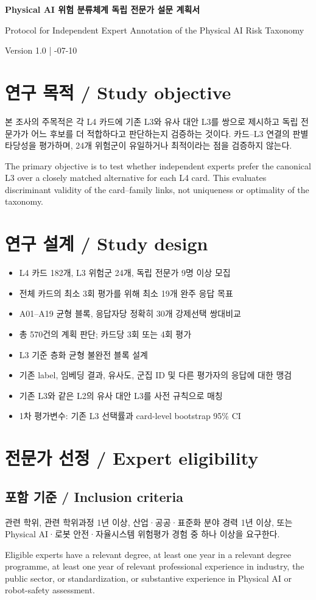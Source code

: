 \documentclass[11pt,a4paper]{article}
\newcommand{\bisection}[2]{\section{#1 / \texorpdfstring{\color{teal}}{}#2}}
\newcommand{\bisubsection}[2]{\subsection{#1 / #2}}
\begin{document}
\begin{center}
{\LARGE\bfseries\color{navy} Physical AI 위험 분류체계 독립 전문가 설문 계획서\par}
\vspace{5pt}
{\Large Protocol for Independent Expert Annotation of the Physical AI Risk Taxonomy\par}
\vspace{10pt}
Version 1.0 \quad | -07-10
\end{center}

\bisection{연구 목적}{Study objective}
본 조사의 주목적은 각 L4 카드에 기존 L3와 유사 대안 L3를 쌍으로 제시하고 독립 전문가가 어느 후보를 더 적합하다고 판단하는지 검증하는 것이다. 카드--L3 연결의 판별 타당성을 평가하며, 24개 위험군이 유일하거나 최적이라는 점을 검증하지 않는다.

The primary objective is to test whether independent experts prefer the canonical L3 over a closely matched alternative for each L4 card. This evaluates discriminant validity of the card--family links, not uniqueness or optimality of the taxonomy.

\bisection{연구 설계}{Study design}
\begin{itemize}
\item L4 카드 182개, L3 위험군 24개, 독립 전문가 9명 이상 모집
\item 전체 카드의 최소 3회 평가를 위해 최소 19개 완주 응답 목표
\item A01--A19 균형 블록, 응답자당 정확히 30개 강제선택 쌍대비교
\item 총 570건의 계획 판단; 카드당 3회 또는 4회 평가
\item L3 기준 층화 균형 불완전 블록 설계
\item 기존 label, 임베딩 결과, 유사도, 군집 ID 및 다른 평가자의 응답에 대한 맹검
\item 기존 L3와 같은 L2의 유사 대안 L3를 사전 규칙으로 매칭
\item 1차 평가변수: 기존 L3 선택률과 card-level bootstrap 95\% CI
\end{itemize}

\bisection{전문가 선정}{Expert eligibility}
\bisubsection{포함 기준}{Inclusion criteria}
관련 학위, 관련 학위과정 1년 이상, 산업·공공·표준화 분야 경력 1년 이상, 또는 Physical AI·로봇 안전·자율시스템 위험평가 경험 중 하나 이상을 요구한다.

Eligible experts have a relevant degree, at least one year in a relevant degree programme, at least one year of relevant professional experience in industry, the public sector, or standardization, or substantive experience in Physical AI or robot-safety assessment.
\end{document}

